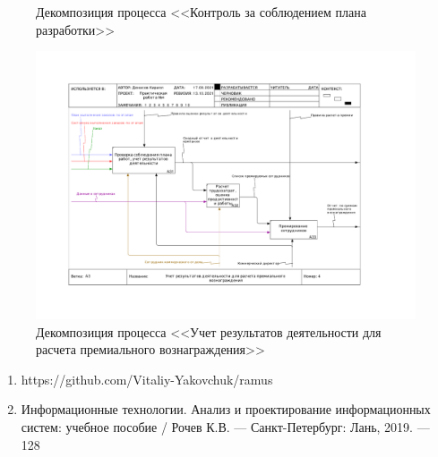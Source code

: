 \documentclass[a4paper,14pt]{extarticle}
\begin{document}
\begin{center}
\begin{figure}[htbp]
	\caption{Декомпозиция процесса <<Контроль за соблюдением плана разработки>>}
	\label{fig:ramuspr6-3}
\end{figure}
\begin{figure}[htbp]
	\centering
	\includegraphics[width=0.9\linewidth]{images/ramusPr6-4}
	\caption{Декомпозиция процесса <<Учет результатов деятельности для расчета премиального вознаграждения>>}
	\label{fig:ramuspr6-4}
\end{figure}
\end{center}
\newpage


\begin{enumerate}
	\item https://github.com/Vitaliy-Yakovchuk/ramus
	\item Информационные технологии. Анализ и проектирование информационных систем: учебное пособие / Рочев К.В. --- Санкт-Петербург: Лань, 2019. --- 128
\end{enumerate}


\end{document}
